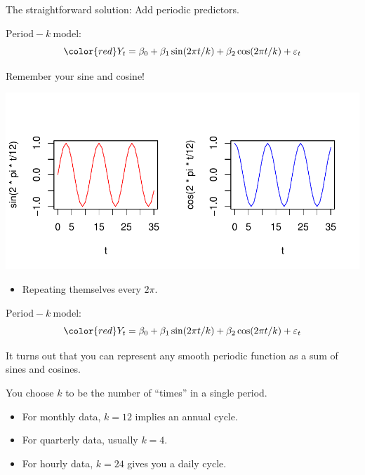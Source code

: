 \documentclass[12pt,xcolor=svgnames]{beamer}
\newcommand{\bk}{\color{black}}
\newcommand{\rd}{\color{red}}
\newcommand{\bl}{\color{blue}}
\newcommand{\sk}{\vspace{.4cm}}
\newcommand{\nochap}{\vspace{0.5cm}}
\begin{document}
\begin{frame}
\nochap

\vspace{-0.3cm}
The  straightforward solution:  Add periodic predictors.

\sk
$\mathrm{Period}\!-\!k~\mbox{model}\!:$
\vspace{-0.35cm}
\[
\rd Y_t = \beta_0 + \beta_1\sin(2\pi t /k) + \beta_2\cos(2\pi t /k)
+ \varepsilon_t 
\]

\vspace{-0.5cm}
Remember your {\rd sine} and {\bl cosine}!
\begin{center}
\includegraphics[scale=0.75,trim=0 25 20 70]{sincos_new}
\end{center}

\vspace{-0.25cm}
\begin{itemize}
\item Repeating themselves every $2\pi$.
\end{itemize}

\end{frame}

\begin{frame}
\nochap

$\mathrm{Period}\!-\!k~\mbox{model}\!:$
\vspace{-0.35cm}
\[
\rd Y_t = \beta_0 + \beta_1\sin(2\pi t /k) + \beta_2\cos(2\pi t /k)
+ \varepsilon_t 
\]

\vspace{-0.5cm}
It turns out that you can represent \bl any \bk smooth periodic function 
as a sum of sines and cosines.

\sk
You choose $k$ to be the number of ``times'' in a single period.
\begin{itemize}
\item For monthly data, $k = 12$ implies an annual cycle.
\item For quarterly data, usually $k=4$.
\item For hourly data, $k=24$ gives you a daily cycle.
\end{itemize}

\end{frame}
\end{document}
